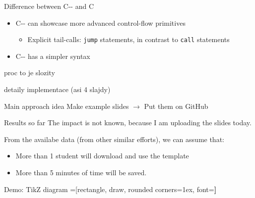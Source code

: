 \documentclass[aspectratio=169]{beamer}
\newcommand{\li}[1]{\lstinline{#1}}
\begin{document}
\begin{frame}{Difference between C-{}- and C}
  \begin{itemize}
    \item C-{}- can showcase more advanced control-flow primitives
    \begin{itemize}
      \item Explicit tail-calls: \li{jump} statements, in contrast to \li{call} statements
    \end{itemize}
    \item C-{}- has a simpler syntax
  \end{itemize}
\end{frame}

\begin{frame}{proc to je slozity}
\end{frame}

\begin{frame}{detaily implementace (asi 4 slajdy)}
\end{frame}

\begin{frame}[standout]{Main approach idea}
Make example slides
$\to$
Put them on GitHub
\end{frame}

\begin{frame}{Results so far}
The impact is not known, because I am uploading the slides today.

\pause
From the availabe data (from other similar efforts), we can assume that:
\begin{itemize}
\item \alert<2>{More than 1 student will download and use the template}
\item \alert<3>{More than 5 minutes of time will be saved.} 
\end{itemize}
\end{frame}

\begin{frame}{Demo: TikZ diagram}
\centering
{}=[rectangle, draw, rounded corners=1ex, font=\huge\bfseries]
\end{frame}
\end{document}
